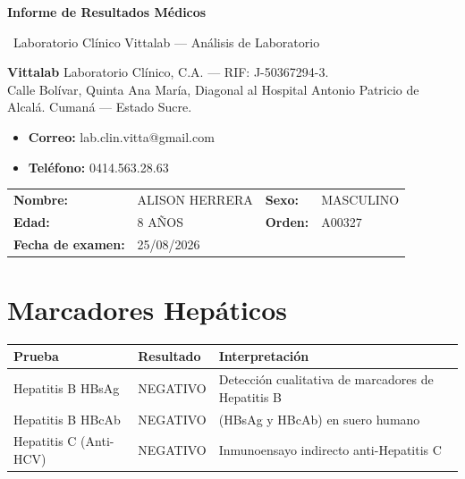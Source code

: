 \documentclass[11pt,a4paper]{article}
\newcommand{\bandaTitulo}[3][fondoOscuro]{%
  \begin{tcolorbox}[
    enhanced,
    colback=#1, colframe=#1,
    boxrule=0pt, arc=8pt, outer arc=8pt,
    width=\linewidth,
    top=18pt, bottom=6pt, left=14pt, right=14pt,
    borderline south={3.5pt}{0pt}{cyanNeon},
  ]
    \begin{minipage}[c]{0.07\linewidth}
      \centering
      \textcolor{cyanNeon}{\fontsize{30}{30}\selectfont\faIcon{flask}}
    \end{minipage}%
    \hspace{8pt}%
    \begin{minipage}[c]{0.88\linewidth}
      {\fontsize{20}{24}\selectfont\bfseries\color{white}#2}\par\vspace{5pt}%
      \textcolor{cyanNeon!80!white}{\small\faIcon{angle-right}~#3}%
    \end{minipage}
    \vspace{4pt}
  \end{tcolorbox}%
  \vspace{8pt}%
}
\begin{document}
\bandaTitulo{Informe de Resultados Médicos}{Laboratorio Clínico Vittalab --- Análisis de Laboratorio}

\vspace{4pt}

\begin{tcolorbox}[tarjetaIcono, title={\faIcon{flask} ~Laboratorio}]
  \textbf{Vittalab} Laboratorio Clínico, C.A. --- RIF: J-50367294-3.\\
  Calle Bolívar, Quinta Ana María, Diagonal al Hospital Antonio Patricio de Alcalá. Cumaná --- Estado Sucre.
  \begin{itemize}[leftmargin=1.2em, itemsep=1pt, nosep]
    \item \textbf{Correo:} lab.clin.vitta@gmail.com
    \item \textbf{Teléfono:} 0414.563.28.63
  \end{itemize}
\end{tcolorbox}

\begin{tcolorbox}[tarjetaDato, title={\faIcon{user} ~Información del Paciente}]
\begin{tabular}{@{}llll@{}}
  \textbf{Nombre:} & ALISON HERRERA & \textbf{Sexo:} & MASCULINO \\
  \textbf{Edad:}   & 8 AÑOS         & \textbf{Orden:} & A00327 \\
  \textbf{Fecha de examen:} & \multicolumn{3}{l}{25/08/2026} \\
\end{tabular}
\end{tcolorbox}

\section*{Marcadores Hepáticos}

\begin{tcolorbox}[tarjetaDato, title={\faIcon{lungs} ~Hepatitis B y C}]
\begin{tabular}{@{}lll@{}}
  \toprule
  \textbf{Prueba} & \textbf{Resultado} & \textbf{Interpretación} \\
  \midrule
  Hepatitis B HBsAg  & NEGATIVO & Detección cualitativa de marcadores de Hepatitis B \\
  Hepatitis B HBcAb  & NEGATIVO & (HBsAg y HBcAb) en suero humano \\
  Hepatitis C (Anti-HCV) & NEGATIVO & Inmunoensayo indirecto anti-Hepatitis C \\
  \bottomrule
\end{tabular}
\end{tcolorbox}
\end{document}
